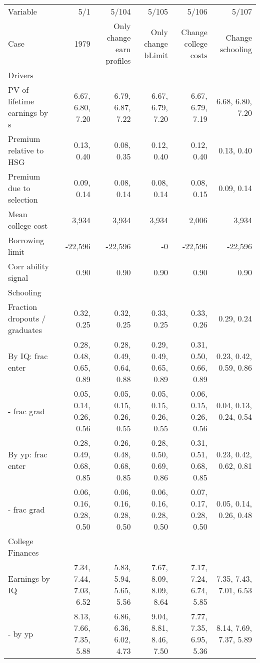 \begin{tabular}{lrrrrr}
\hline
Variable & 5/1  & 5/104  & 5/105  & 5/106  & 5/107  \\ 
Case & 1979  & Only change earn profiles  & Only change bLimit  & Change college costs  & Change schooling  \\ 
Drivers &   &   &   &   &   \\ 
PV of lifetime earnings by s & 6.67, 6.80, 7.20  & 6.79, 6.87, 7.22  & 6.67, 6.79, 7.20  & 6.67, 6.79, 7.19  & 6.68, 6.80, 7.20  \\ 
Premium relative to HSG & 0.13, 0.40  & 0.08, 0.35  & 0.12, 0.40  & 0.12, 0.40  & 0.13, 0.40  \\ 
Premium due to selection & 0.09, 0.14  & 0.08, 0.14  & 0.08, 0.14  & 0.08, 0.15  & 0.09, 0.14  \\ 
Mean college cost & 3,934  & 3,934  & 3,934  & 2,006  & 3,934  \\ 
Borrowing limit & -22,596  & -22,596  & -0  & -22,596  & -22,596  \\ 
Corr ability signal & 0.90  & 0.90  & 0.90  & 0.90  & 0.90  \\ 
\hline
Schooling &   &   &   &   &   \\ 
Fraction dropouts / graduates & 0.32, 0.25  & 0.32, 0.25  & 0.33, 0.25  & 0.33, 0.26  & 0.29, 0.24  \\ 
By IQ: frac enter & 0.28, 0.48, 0.65, 0.89  & 0.28, 0.49, 0.64, 0.88  & 0.29, 0.49, 0.65, 0.89  & 0.31, 0.50, 0.66, 0.89  & 0.23, 0.42, 0.59, 0.86  \\ 
- frac grad & 0.05, 0.14, 0.26, 0.56  & 0.05, 0.15, 0.26, 0.55  & 0.05, 0.15, 0.26, 0.55  & 0.06, 0.15, 0.26, 0.56  & 0.04, 0.13, 0.24, 0.54  \\ 
By yp: frac enter & 0.28, 0.49, 0.68, 0.85  & 0.26, 0.48, 0.68, 0.85  & 0.28, 0.50, 0.69, 0.86  & 0.31, 0.51, 0.68, 0.85  & 0.23, 0.42, 0.62, 0.81  \\ 
- frac grad & 0.06, 0.16, 0.28, 0.50  & 0.06, 0.16, 0.28, 0.50  & 0.06, 0.16, 0.28, 0.50  & 0.07, 0.17, 0.28, 0.50  & 0.05, 0.14, 0.26, 0.48  \\ 
\hline
College Finances &   &   &   &   &   \\ 
Earnings by IQ & 7.34, 7.44, 7.03, 6.52  & 5.83, 5.94, 5.65, 5.56  & 7.67, 8.09, 8.09, 8.64  & 7.17, 7.24, 6.74, 5.85  & 7.35, 7.43, 7.01, 6.53  \\ 
- by yp & 8.13, 7.66, 7.35, 5.88  & 6.86, 6.36, 6.02, 4.73  & 9.04, 8.81, 8.46, 7.50  & 7.77, 7.35, 6.95, 5.36  & 8.14, 7.69, 7.37, 5.89  \\ 

\end{tabular}
